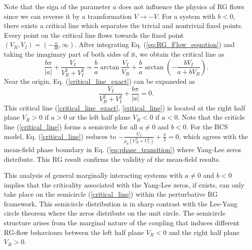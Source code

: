 \documentclass[aps,prl,twocolumn,nofootinbib,superscriptaddress,notitlepage,longbibliography]{revtex4-1}
\begin{document}
	 Note that the sign of the parameter $a$ does not influence the physics of RG flows since we can reverse it by a transformation $V\to-V$. For a system with $b<0$, there exists a critical line which separates the trivial and nontrivial fixed points. Every point on the critical line flows towards the fixed point $(V_R, V_I) = (-\frac{a}{3b}, \infty)$. %
	 After integrating Eq. (\ref{eq:RG_Flow_equation}) and taking the imaginary part of both sides of it, we obtain the critical line as
	\begin{equation}
		\frac{b\pi}{|a|}+\frac{V_I}{V_R^2+V_I^2}=\frac{b}{a}\arctan{\frac{V_I}{V_R}}+\frac{b}{a}\arctan{(-\frac{b V_I}{a+b V_R})}.
		\label{critical_line_exact}
	\end{equation}
	Near the origin, Eq. (\ref{critical_line_exact}) can be expaneded as
	\begin{equation}
		\frac{V_I}{V_R^2+V_I^2}+\frac{b\pi}{|a|}=0.
		\label{critical_line}
	\end{equation}
	This critical line (\ref{critical_line_exact}, \ref{critical_line}) is located at the right half plane $V_R>0$ if $a>0$ or the left half plane $V_R<0$ if $a<0$. Note that the criticle line (\ref{critical_line}) forms a semicircle for all $a\neq0$ and $b<0$. For the BCS model, Eq. (\ref{critical_line}) reduces to $-\frac{U_I}{\rho_0(U_R^2+U_I^2)}+\frac{\pi}{2}=0$, which agrees with the mean-field phase boundary in Eq. (\ref{eq:phase_transition}) where Yang-Lee zeros distribute. This RG result confirms the validity of the mean-field results. %
	
	
	This analysis of general marginally interacting systems with $a \neq 0$ and $b < 0$ implies that the criticality associated with the Yang-Lee zeros, if exists, can only take place on the semicircle (\ref{critical_line}) within the perturbative RG framework. %
	This semicircle distribution is in sharp contrast with the Lee-Yang circle theorem \cite{PhysRev.87.410} where the zeros distribute on the unit circle. The semicircle structure arises from the marginal nature of the coupling that induces different RG-flow behaviours between the left half plane $V_R<0$ and the right half plane $V_R>0$. 
	
\end{document}
